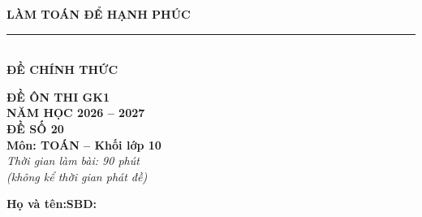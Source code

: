 \documentclass[12pt,a4paper]{article}
\begin{document}
\noindent
\begin{minipage}[c]{0.38\textwidth}
    \centering
    \textbf{LÀM TOÁN ĐỂ HẠNH PHÚC}\\[-2pt]
    \rule{3.2cm}{0.6pt}\\[4pt]
    \textbf{ĐỀ CHÍNH THỨC}
\end{minipage}\hfill
\begin{minipage}[c]{0.35\textwidth}
    \centering
    \textbf{ĐỀ ÔN THI GK1}\\
    \textbf{NĂM HỌC 2026 -- 2027}\\[2pt]
    \textbf{ĐỀ SỐ 20}\\
    \textbf{Môn: TOÁN -- Khối lớp 10}\\
    \textit{\small Thời gian làm bài: 90 phút\\(không kể thời gian phát đề)}
\end{minipage}

\vspace{0.2cm}
\noindent
\begin{minipage}[b]{0.78\textwidth}
    \textbf{Họ và tên:}\dotfill\textbf{SBD:}\makebox[3.5cm]{\dotfill}
\end{minipage}\hfill
\begin{minipage}[b]{0.20\textwidth}
    \hfill
    \setlength{\fboxrule}{0.8pt}%
\end{minipage}
\vspace{0.2cm}
\end{document}
